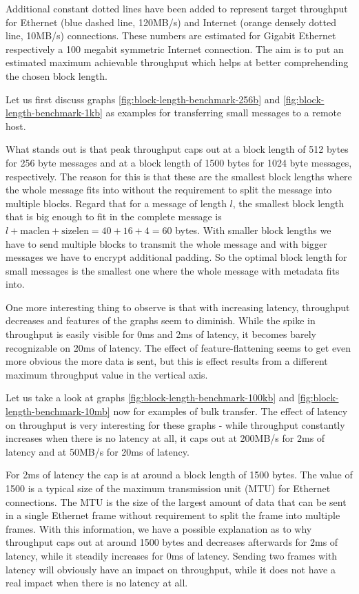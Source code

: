 Additional constant dotted lines have been added to represent target throughput for Ethernet (blue dashed line, 120MB/s) and Internet (orange densely dotted line, 10MB/s) connections.
These numbers are estimated for Gigabit Ethernet respectively a 100 megabit symmetric Internet connection.
The aim is to put an estimated maximum achievable throughput which helps at better comprehending the chosen block length.

\medskip

Let us first discuss graphs \ref{fig:block-length-benchmark-256b} and \ref{fig:block-length-benchmark-1kb} as examples for transferring small messages to a remote host.

What stands out is that peak throughput caps out at a block length of 512 bytes for 256 byte messages and at a block length of 1500 bytes for 1024 byte messages, respectively.
The reason for this is that these are the smallest block lengths where the whole message fits into without the requirement to split the message into multiple blocks.
Regard that for a message of length $l$, the smallest block length that is big enough to fit in the complete message is $l + \text{maclen} + \text{sizelen} = 40 + 16 + 4 = 60$ bytes.
With smaller block lengths we have to send multiple blocks to transmit the whole message and with bigger messages we have to encrypt additional padding.
So the optimal block length for small messages is the smallest one where the whole message with metadata fits into.

One more interesting thing to observe is that with increasing latency, throughput decreases and features of the graphs seem to diminish.
While the spike in throughput is easily visible for 0ms and 2ms of latency, it becomes barely recognizable on 20ms of latency.
The effect of feature-flattening seems to get even more obvious the more data is sent, but this is effect results from a different maximum throughput value in the vertical axis.

Let us take a look at graphs \ref{fig:block-length-benchmark-100kb} and \ref{fig:block-length-benchmark-10mb} now for examples of bulk transfer.
The effect of latency on throughput is very interesting for these graphs - while throughput constantly increases when there is no latency at all, it caps out at 200MB/s for 2ms of latency and at 50MB/s for 20ms of latency.

For 2ms of latency the cap is at around a block length of 1500 bytes.
The value of 1500 is a typical size of the maximum transmission unit (MTU) for Ethernet connections.
The MTU is the size of the largest amount of data that can be sent in a single Ethernet frame without requirement to split the frame into multiple frames.
With this information, we have a possible explanation as to why throughput caps out at around 1500 bytes and decreases afterwards for 2ms of latency, while it steadily increases for 0ms of latency.
Sending two frames with latency will obviously have an impact on throughput, while it does not have a real impact when there is no latency at all.

